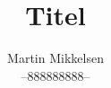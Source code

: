 \documentclass{mimosis}
\begin{document}
	
	\author{Martin Mikkelsen  \\ 
		--888888888-- \\ }
	\title{Titel}
	\maketitle
	
	
	
	\thispagestyle{firststyle}
	
	\lipsum[0-1]	
	
	
\end{document}
